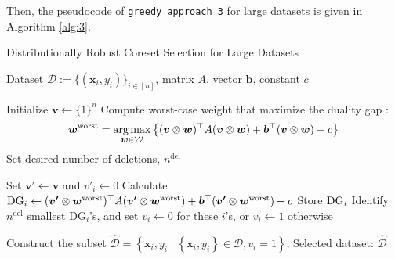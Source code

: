 Then, the pseudocode of {\tt greedy approach 3} for large datasets is given in Algorithm \ref{alg:3}.

%
\begin{algorithm}[H]
  \renewcommand{\algorithmicrequire}{\textbf{Input:}}
  \renewcommand{\algorithmicensure}{\textbf{Output:}}
  \caption{Distributionally Robust Coreset Selection for Large Datasets}
  \label{alg:3}
  \begin{algorithmic}[1]
      \Require Dataset ${\mathcal D} := \{(\bm x_i, y_i)\}_{i \in [n]}$, matrix $A$, vector $\bm b$, constant $c$

      \State Initialize $\boldsymbol{v} \gets \{1\}^n$
      \State Compute worst-case weight that maximize the duality gap :
      \[
      \bm w^{\mathrm{worst}} = \operatorname*{arg\,max}_{\boldsymbol{w} \in \mathcal{W}} \left\{(\boldsymbol{v} \otimes \boldsymbol{w})^\top A (\boldsymbol{v} \otimes \boldsymbol{w}) + \bm b^\top (\boldsymbol{v} \otimes \boldsymbol{w}) + c\right\}
      \]
      \State Set desired number of deletions, $n^\mathrm{del}$

					\State Set $\boldsymbol{v'} \gets \boldsymbol{v}$ and $v'_i \gets 0$ 
					\State Calculate ${\rm DG}_i \gets (\boldsymbol{v'} \otimes \boldsymbol{w}^{\mathrm{worst}})^\top A (\boldsymbol{v'} \otimes \boldsymbol{w}^{\mathrm{worst}}) + \bm b^\top (\boldsymbol{v'} \otimes \boldsymbol{w}^{\mathrm{worst}}) + c$
					\State Store ${\rm DG}_i$
			\EndFor
			\State Identify $n^\mathrm{del}$ smallest $\mathrm{DG}_i$'s, and set $v_{i} \gets 0$ for these $i$'s, or $v_{i} \gets 1$ otherwise

      \State Construct the subset $\hat{\mathcal{D}}=\left\{\bm x_{i}, y_i \mid \left\{\bm x_{i}, y_i\right\} \in \mathcal{D}, v_i=1\right\}$;
      \Ensure Selected dataset: $\hat{\mathcal{D}}$

  \end{algorithmic}
\end{algorithm}


